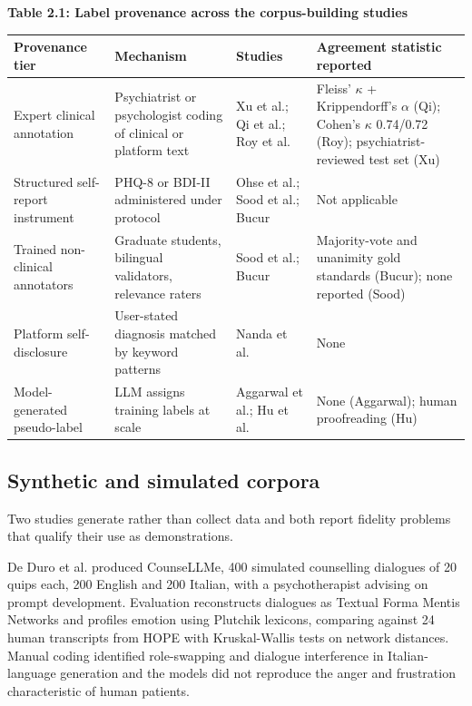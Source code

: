 \documentclass[11pt]{article}
\begin{document}
	\begin{center}
		\textbf{Table 2.1: Label provenance across the corpus-building studies}
		\vspace{2pt}
		
		\scriptsize
		\setlength{\tabcolsep}{3pt}\renewcommand{\arraystretch}{1.1}
		\begin{tabularx}{\textwidth}{|X|X|X|X|}
			\hline
			\textbf{Provenance tier} & \textbf{Mechanism} & \textbf{Studies} & \textbf{Agreement statistic reported} \\
			\hline
			Expert clinical annotation & Psychiatrist or psychologist coding of clinical or platform text & Xu et al.\cite{Xu2025.01.03.24318117}; Qi et al.\cite{qi2024supervisedlearninglargelanguage}; Roy et al.\cite{10.1145/3805697} & Fleiss' $\kappa$ + Krippendorff's $\alpha$ (Qi); Cohen's $\kappa$ 0.74/0.72 (Roy); psychiatrist-reviewed test set (Xu) \\
			\hline
			Structured self-report instrument & PHQ-8 or BDI-II administered under protocol & Ohse et al.\cite{OHSE2024101663}; Sood et al.\cite{10385480}; Bucur\cite{bucur2024leveraging} & Not applicable \\
			\hline
			Trained non-clinical annotators & Graduate students, bilingual validators, relevance raters & Sood et al.\cite{sood2024understandingstudentsentimentmental}; Bucur\cite{bucur2024leveraging} & Majority-vote and unanimity gold standards (Bucur); none reported (Sood) \\
			\hline
			Platform self-disclosure & User-stated diagnosis matched by keyword patterns & Nanda et al.\cite{10714257} & None \\
			\hline
			Model-generated pseudo-label & LLM assigns training labels at scale & Aggarwal et al.\cite{10973522}; Hu et al.\cite{hu2024psycollmenhancingllmpsychological} & None (Aggarwal); human proofreading (Hu) \\
			\hline
		\end{tabularx}
	\end{center}
	
	\subsection{Synthetic and simulated corpora}
	
	Two studies generate rather than collect data and both report fidelity problems that qualify their use as demonstrations.
	
	De Duro et al.\cite{DEDURO2025100170} produced CounseLLMe, 400 simulated counselling dialogues of 20 quips each, 200 English and 200 Italian, with a psychotherapist advising on prompt development. Evaluation reconstructs dialogues as Textual Forma Mentis Networks and profiles emotion using Plutchik lexicons, comparing against 24 human transcripts from HOPE with Kruskal-Wallis tests on network distances. Manual coding identified role-swapping and dialogue interference in Italian-language generation and the models did not reproduce the anger and frustration characteristic of human patients.
	
\end{document}
